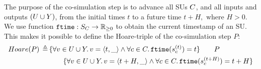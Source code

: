 The purpose of the co-simulation step is to advance all SUs $C$, and all inputs and outputs $(U \cup Y)$, from the initial times $t$ to a future time $t+H, \textrm{ where } H > 0$. 
We use function $\mathtt{ftime}: S_{C} \to \mathbb{R}_{\geq 0}$ to obtain the current timestamp of an SU.
This makes it possible to define the Hoare-triple of the co-simulation step $P$:
\begin{align*}
  Hoare(P) \,\triangleq\, &\{\forall v \in U \cup Y \ldotp v =  \left\langle t, \_ \right\rangle  \land \forall c \in C \ldotp \mathtt{ftime}(s_{c}^{(t)}) = t\} \qquad  P \\
  & \qquad \{\forall v \in U \cup Y \ldotp v =  \left\langle t+H, \_ \right\rangle  \land \forall c \in C \ldotp \mathtt{ftime}(s_{c}^{(t+H)}) = t+H \}
\end{align*}

